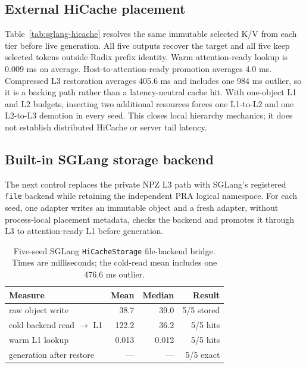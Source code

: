 \documentclass[10pt]{article}
\begin{document}
\subsection{External HiCache placement}
\begin{table}[!htbp]
\centering
\small
\caption{Five-seed external PRA HiCache result. L1/L2 on Apple unified memory
denote attention readiness and host-array ownership; L3 is compressed disk
backing.}

\label{tab:sglang-hicache}
\end{table}

Table~\ref{tab:sglang-hicache} resolves the same immutable selected K/V from
each tier before live generation. All five outputs recover the target and all
five keep selected tokens outside Radix prefix identity. Warm attention-ready
lookup is 0.009 ms on average. Host-to-attention-ready promotion averages 4.0
ms. Compressed L3 restoration averages 405.6 ms and includes one 984 ms
outlier, so it is a backing path rather than a latency-neutral cache hit. With
one-object L1 and L2 budgets, inserting two additional resources forces one
L1-to-L2 and one L2-to-L3 demotion in every seed. This closes local hierarchy
mechanics; it does not establish distributed HiCache or server tail latency.

\subsection{Built-in SGLang storage backend}
The next control replaces the private NPZ L3 path with SGLang's registered
\texttt{file} backend while retaining the independent PRA logical namespace.
For each seed, one adapter writes an immutable object and a fresh adapter,
without process-local placement metadata, checks the backend and promotes it
through L3 to attention-ready L1 before generation.

\begin{table}[!htbp]
\centering
\small
\caption{Five-seed SGLang \texttt{HiCacheStorage} file-backend bridge. Times
are milliseconds; the cold-read mean includes one 476.6 ms outlier.}
\begin{tabular}{lrrr}
\toprule
Measure & Mean & Median & Result \\
\midrule
raw object write & 38.7 & 39.0 & 5/5 stored \\
cold backend read $\rightarrow$ L1 & 122.2 & 36.2 & 5/5 hits \\
warm L1 lookup & 0.013 & 0.012 & 5/5 hits \\
generation after restore & --- & --- & 5/5 exact \\
\bottomrule
\end{tabular}
\label{tab:sglang-builtin-hicache}
\end{table}
\end{document}
